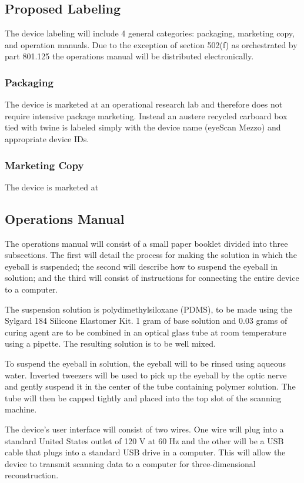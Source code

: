 \subsection{Proposed Labeling}

The device labeling will include 4 general categories: packaging,
marketing copy, and operation manuals. Due to the exception of section
502(f) as orchestrated by part 801.125 the operations manual will be
distributed electronically.

\subsubsection{Packaging}
The device is marketed at an operational research lab and therefore
does not require intensive package marketing. Instead an austere
recycled carboard box tied with twine is labeled simply with the
device name (eyeScan Mezzo) and appropriate device IDs.

\subsubsection{Marketing Copy}
The device is marketed at 

\subsection{Operations Manual}
The operations manual will consist of a small paper booklet divided into three subsections. The first will detail the process for making the solution in which the eyeball is suspended; the second will describe how to suspend the eyeball in solution; and the third will consist of instructions for connecting the entire device to a computer. 

The suspension solution is polydimethylsiloxane (PDMS), to be made using the Sylgard 184 Silicone Elastomer Kit. 1 gram of base solution and 0.03 grams of curing agent are to be combined in an optical glass tube at room temperature using a pipette. The resulting solution is to be well mixed.

To suspend the eyeball in solution, the eyeball will to be rinsed using aqueous water. Inverted tweezers will be used to pick up the eyeball by the optic nerve and gently suspend it in the center of the tube containing polymer solution. The tube will then be capped tightly and placed into the top slot of the scanning machine. 

The device’s user interface will consist of two wires. One wire will plug into a standard United States outlet of 120 V at 60 Hz  and the other will be a USB cable that plugs into a standard USB drive in a computer. This will allow the device to transmit scanning data to a computer for  three-dimensional reconstruction. 

